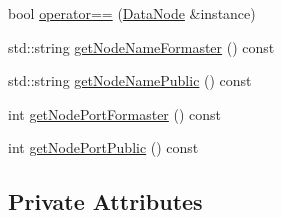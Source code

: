 \begin{DoxyCompactItemize}
\item 
bool \hyperlink{classDataNode_a1cfd13daabc2c5b82d5b22fa8835c7ee}{operator==} (\hyperlink{classDataNode}{\-Data\-Node} \&instance)
\item 
std\-::string \hyperlink{classDataNode_af3254e5f7a69c389618d23090eacc6ed}{get\-Node\-Name\-Formaster} () const 
\item 
std\-::string \hyperlink{classDataNode_a46aed0f07640f0833f87405b2084656d}{get\-Node\-Name\-Public} () const 
\item 
int \hyperlink{classDataNode_a89e54bfc19a24d97248f1dca5808b341}{get\-Node\-Port\-Formaster} () const 
\item 
int \hyperlink{classDataNode_af305eef4e4c22bec38af7e837151bc4c}{get\-Node\-Port\-Public} () const 
\end{DoxyCompactItemize}
\subsection*{\-Private \-Attributes}
